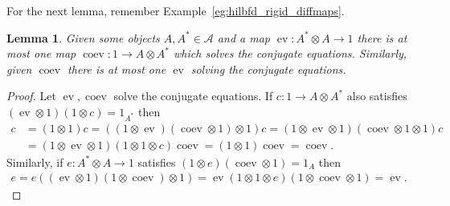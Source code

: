 \documentclass[a4paper,11pt]{article}
\theoremstyle{plain}
\newtheorem{lemma}[proposition]{Lemma}
\theoremstyle{remark}
\newenvironment{example}
  {\pushQED{\qed}\renewcommand{\qedsymbol}{$\triangle$}\examplex}
  {\popQED\endexamplex}
\newcommand{\mc}[1]{\mathcal{#1}}
\newcommand{\catHilbFD}{\textsf{Hilb}_{\text{fd}}}
\newcommand{\ev}{\operatorname{ev}}
\newcommand{\coev}{\operatorname{coev}}
\begin{document}
For the next lemma, remember Example~\ref{eg:hilbfd_rigid_diffmaps}.

\begin{lemma}\label{lem:one_ev_for_coev}
Given some objects $A, A^*\in\mc A$ and a map $\ev \colon A^*\otimes A\to 1$ there is at most one map $\coev\colon 1\to A\otimes A^*$ which solves the conjugate equations.  Similarly, given $\coev$ there is at most one $\ev$ solving the conjugate equations.
\end{lemma}
\begin{proof}
Let $\ev, \coev$ solve the conjugate equations.  If $c \colon 1 \to A\otimes A^*$ also satisfies $(\ev\otimes 1)(1\otimes c) = 1_{A^*}$ then
\begin{align*}
c &= (1\otimes 1)c = ((1\otimes\ev)(\coev\otimes 1)\otimes 1)c = (1\otimes\ev\otimes 1)(\coev\otimes 1\otimes 1)c \\
&= (1 \otimes \ev \otimes 1)(1\otimes 1\otimes c) \coev = (1\otimes 1)\coev = \coev.
\end{align*}
Similarly, if $e \colon A^*\otimes A \to 1$ satisfies $(1\otimes e)(\coev\otimes 1) = 1_A$ then
\begin{align*}
e = e ((\ev\otimes 1)(1\otimes\coev) \otimes 1) = \ev(1\otimes1\otimes e)(1\otimes\coev\otimes 1) = \ev.
\end{align*}
\end{proof}


\end{document}

